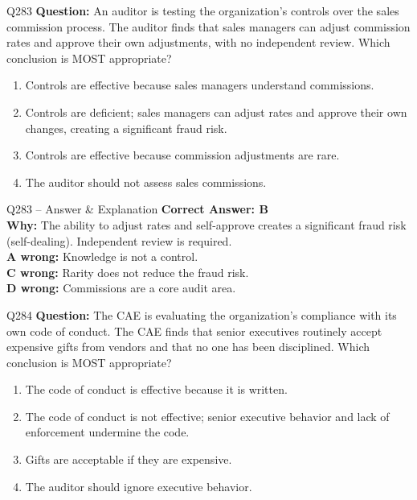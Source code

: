 \documentclass[aspectratio=169,10pt]{beamer}
\begin{document}
	\begin{frame}[t]{Q283}
		\small
		\textbf{Question:} An auditor is testing the organization's controls over the sales commission process. The auditor finds that sales managers can adjust commission rates and approve their own adjustments, with no independent review. Which conclusion is MOST appropriate?
		\begin{enumerate}[label=\Alph*.,itemsep=1pt,topsep=2pt]
			\item Controls are effective because sales managers understand commissions.
			\item Controls are deficient; sales managers can adjust rates and approve their own changes, creating a significant fraud risk.
			\item Controls are effective because commission adjustments are rare.
			\item The auditor should not assess sales commissions.
		\end{enumerate}
	\end{frame}
	
	\begin{frame}[t]{Q283 -- Answer \& Explanation}
		\small
		\textbf{Correct Answer: B} \\[4pt]
		\textbf{Why:} The ability to adjust rates and self-approve creates a significant fraud risk (self-dealing). Independent review is required. \\[4pt]
		\textbf{A wrong:} Knowledge is not a control. \\[2pt]
		\textbf{C wrong:} Rarity does not reduce the fraud risk. \\[2pt]
		\textbf{D wrong:} Commissions are a core audit area.
	\end{frame}
	
	\begin{frame}[t]{Q284}
		\small
		\textbf{Question:} The CAE is evaluating the organization's compliance with its own code of conduct. The CAE finds that senior executives routinely accept expensive gifts from vendors and that no one has been disciplined. Which conclusion is MOST appropriate?
		\begin{enumerate}[label=\Alph*.,itemsep=1pt,topsep=2pt]
			\item The code of conduct is effective because it is written.
			\item The code of conduct is not effective; senior executive behavior and lack of enforcement undermine the code.
			\item Gifts are acceptable if they are expensive.
			\item The auditor should ignore executive behavior.
		\end{enumerate}
	\end{frame}
	
\end{document}
